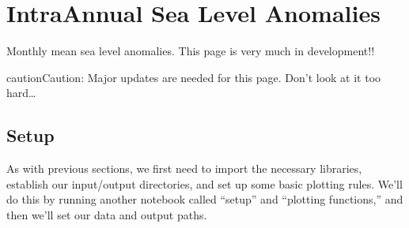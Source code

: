 \documentclass[letterpaper,10pt,english]{jupyterBook}
\begin{document}
\sphinxstepscope


\section{Intra\sphinxhyphen{}Annual Sea Level Anomalies}
\label{\detokenize{notebooks/regional_and_local/SL_anomaly_intra-annual:intra-annual-sea-level-anomalies}}\label{\detokenize{notebooks/regional_and_local/SL_anomaly_intra-annual::doc}}
\sphinxAtStartPar
Monthly mean sea level anomalies. This page is very much in development!!

\begin{sphinxadmonition}{caution}{Caution:}
\sphinxAtStartPar
Major updates are needed for this page. Don’t look at it too hard…
\end{sphinxadmonition}


\subsection{Setup}
\label{\detokenize{notebooks/regional_and_local/SL_anomaly_intra-annual:setup}}
\sphinxAtStartPar
As with previous sections, we first need to import the necessary libraries, establish our input/output directories, and set up some basic plotting rules. We’ll do this by running another notebook called “setup” and “plotting functions,” and then we’ll set our data and output paths.
\end{document}
